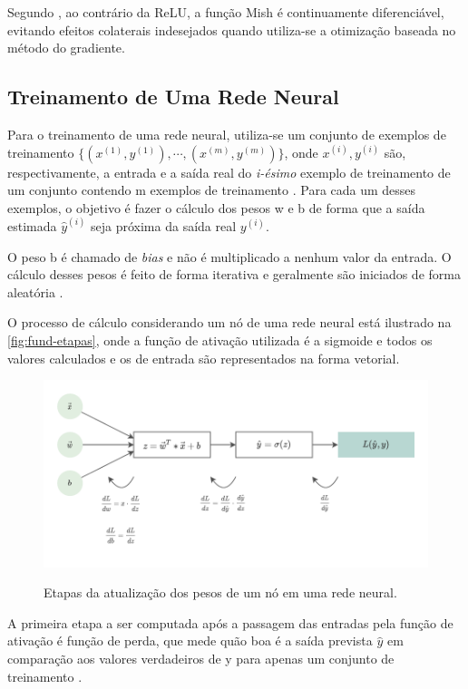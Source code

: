 Segundo , ao contrário da ReLU, a função Mish é continuamente diferenciável, evitando efeitos colaterais indesejados quando utiliza-se a otimização baseada no método do gradiente.

\subsection{Treinamento de Uma Rede Neural}\label{cap:fund-ia-rn-treinamento}

Para o treinamento de uma rede neural, utiliza-se um conjunto de exemplos de treinamento $\{(x^{(1)}, y^{(1)}), \cdots, (x^{(m)}, y^{(m)})\}$, onde $x^{(i)}, y^{(i)}$ são, respectivamente, a entrada e a saída real do \textit{i-ésimo} exemplo de treinamento de um conjunto contendo m exemplos de treinamento \cite{ref:Ng}. Para cada um desses exemplos, o objetivo é fazer o cálculo dos pesos w e b de forma que a saída estimada $\hat{y}^{(i)}$ seja próxima da saída real $y^{(i)}$.

O peso b é chamado de \textit{bias} e não é multiplicado a nenhum valor da entrada. O cálculo desses pesos é feito de forma iterativa e geralmente são iniciados de forma aleatória \cite{ref:Ng}.

O processo de cálculo considerando um nó de uma rede neural está ilustrado na \autoref{fig:fund-etapas}, onde a função de ativação utilizada é a sigmoide e todos os valores calculados e os de entrada são representados na forma vetorial.

\begin{figure}[h!] %
  \centering
  \caption{Etapas da atualização dos pesos de um nó em uma rede neural.}
  \includegraphics[scale=1.1]{img/img-fundamentacao-etapas.pdf}
  \label{fig:fund-etapas}
\end{figure}

A primeira etapa a ser computada após a passagem das entradas pela função de ativação é função de perda, que mede quão boa é a saída prevista $\hat{y}$ em comparação aos valores verdadeiros de y para apenas um conjunto de treinamento \cite{ref:Ng}.

